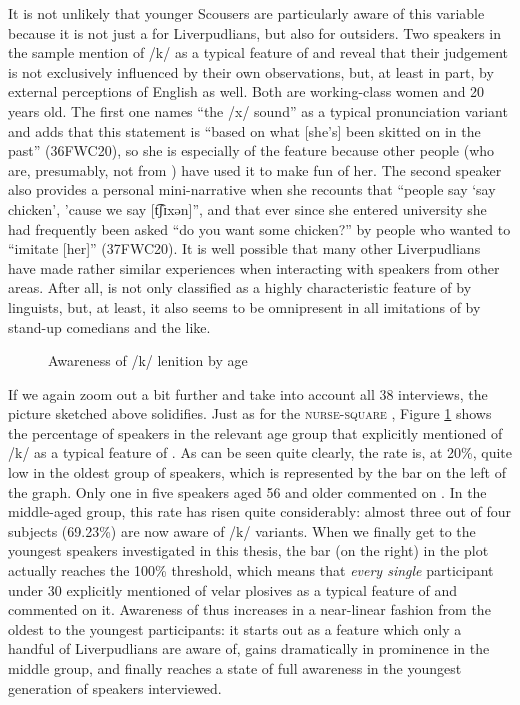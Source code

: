 It is not unlikely that younger Scousers are particularly aware of this variable because it is not just a  for Liverpudlians, but also for outsiders.
Two speakers in the sample mention  of /k/ as a typical feature of  and reveal that their judgement is not exclusively influenced by their own observations, but, at least in part, by external perceptions of  English as well.
Both are working-class women and 20 years old.
The first one names ``the /x/ sound'' as a typical  pronunciation variant and adds that this statement is ``based on what [she's] been skitted on in the past'' (36FWC20), so she is especially  of the feature because other people (who are, presumably, not from ) have used it to make fun of her.
The second speaker also provides a personal mini-narrative when she recounts that ``people say `say chicken', 'cause we say [t͡ʃɪxən]'', and that ever since she entered university she had frequently been asked ``do you want some chicken?'' by people who wanted to ``imitate [her]'' (37FWC20).
It is well possible that many other Liverpudlians have made rather similar experiences when interacting with speakers from other areas.
After all,  is not only classified as a highly characteristic feature of  by linguists, but,  at least, it also seems to be omnipresent in all imitations of  by stand-up comedians and the like.

\begin{figure}[h]
	\centering
		\resizebox{.49\linewidth}{!}{} 
	\caption{Awareness of /k/ lenition by age}
	\label{fig.aware.k}
\end{figure}

If we again zoom out a bit further and take into account all 38 interviews, the picture sketched above solidifies.
Just as for the \textsc{nurse}-\textsc{square} , Figure \ref{fig.aware.k} shows the percentage of speakers in the relevant age group that explicitly mentioned  of /k/ as a typical feature of .
As can be seen quite clearly, the rate is, at 20\%, quite low in the oldest group of speakers, which is represented by the bar on the left of the graph.
Only one in five speakers aged 56 and older commented on .
In the middle-aged group, this rate has risen quite considerably: almost three out of four subjects (69.23\%) are now aware of  /k/ variants.
When we finally get to the youngest speakers investigated in this thesis, the bar (on the right) in the plot actually reaches the 100\% threshold, which means that \emph{every single} participant under 30 explicitly mentioned  of velar plosives as a typical feature of  and commented on it.
Awareness of  thus increases in a near-linear fashion from the oldest to the youngest participants: it starts out as a feature which only a handful of Liverpudlians are aware of, gains dramatically in prominence in the middle group, and finally reaches a state of full  awareness in the youngest generation of speakers interviewed.

